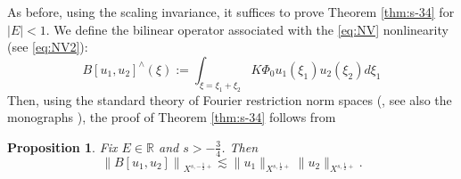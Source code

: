 \documentclass[a4paper,
11pt,  reqno]{amsart}
\newcommand{\5}{\textup{V}}
\newtheorem{proposition}[theorem]{Proposition}
\theoremstyle{remark}
\newcommand{\R}{\mathbb{R}}
\numberwithin{equation}{section}
\numberwithin{theorem}{section}
\providecommand{\DIFaddbegin}{} %
\providecommand{\DIFaddend}{} %
\providecommand{\DIFdelbegin}{} %
\providecommand{\DIFdelend}{} %
\begin{document}
As before, using the scaling invariance, it suffices to prove Theorem \ref{thm:s-34} for $|E|<1$. We define the bilinear operator associated with the \eqref{eq:NV} nonlinearity (see \eqref{eq:NV2}):
$$
B[u_1,u_2]^\wedge(\xi):=\int_{\xi=\xi_1+\xi_2} K\Phi_0u_1(\xi_1)u_2(\xi_2)d\xi_1
$$
Then, using the standard theory of Fourier restriction norm spaces (\cite{bourg1,bourg2}, see also the monographs \cite{linaresponce, tao_book}), the proof of Theorem \ref{thm:s-34} follows from 

\begin{proposition}\DIFaddbegin \label{prop:bilin_s-34}
\DIFaddend Fix $E\in \R$ and $s>-\frac{3}{4}$. Then
\DIFdelbegin %
\DIFdelend \DIFaddbegin \begin{equation}\label{eq:bilin_s-34}
\left\| B[u_1,u_2]\right\|_{X^{s,-\frac{1}{2}+}}\lesssim \|u_1\|_{X^{s,\frac{1}{2}+}}\|u_2\|_{X^{s,\frac{1}{2}+}}.
\end{equation}\DIFaddend 
\DIFdelbegin %

\DIFdelend \end{proposition}
\end{document}
